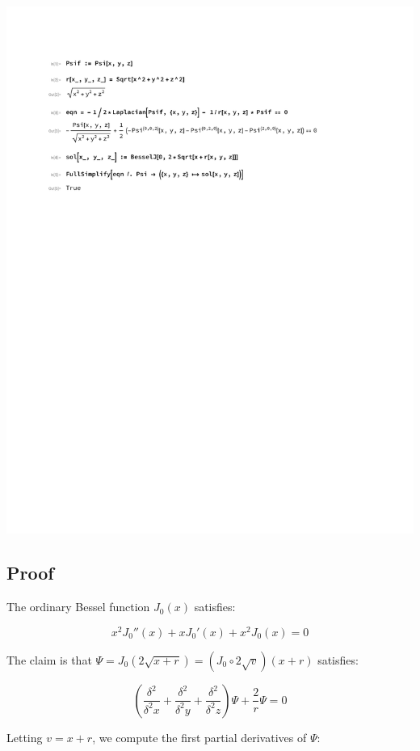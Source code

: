 \documentclass{article}
\begin{document}
\includegraphics[page=1, clip, trim=1in 7in 1in 1in, width=\textwidth]{improved.pdf}

\vfill\eject
\subsection*{Proof}
The ordinary Bessel function $J_0(x)$ satisfies:

\begin{equation}
x^2 J_0''(x) + xJ_0'(x) + x^2J_0(x) = 0
\end{equation}

The claim is that $\Psi = J_0(2\sqrt{x+r}) = (J_0 \circ 2\sqrt{v}) (x+r)$ satisfies:

\begin{equation}
\left(\frac{\delta^2}{\delta^2 x} + \frac{\delta^2}{\delta^2 y} + \frac{\delta^2}{\delta^2 z}\right) \Psi + \frac{2}{r}\Psi = 0
\end{equation}

Letting $v=x+r$, we compute the first partial derivatives of $\Psi$:
\end{document}
